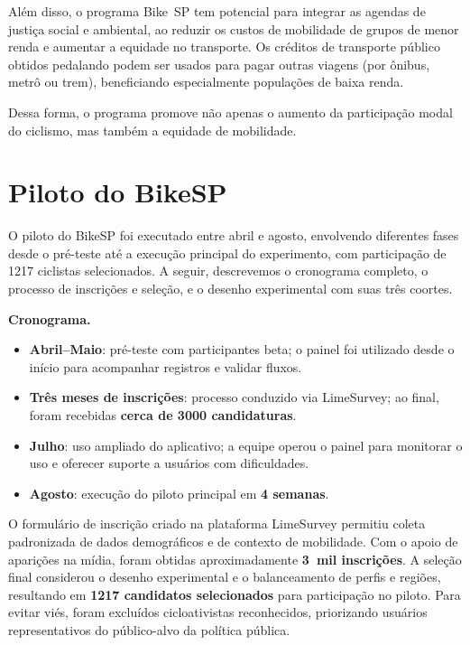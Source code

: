 Além disso, o programa Bike~SP tem potencial para integrar as agendas de justiça
social e ambiental, ao reduzir os custos de mobilidade de grupos de menor renda
e aumentar a equidade no transporte. Os créditos de transporte público obtidos
pedalando podem ser usados para pagar outras viagens (por ônibus, metrô ou trem),
beneficiando especialmente populações de baixa renda.

Dessa forma, o programa promove não apenas o aumento da participação modal do
ciclismo, mas também a equidade de mobilidade\citep{vanoutrive2020, jeekel2017}.

\section{Piloto do BikeSP}
\label{sec:piloto-bikesp}
O piloto do BikeSP foi executado entre abril e agosto, envolvendo diferentes fases desde o pré-teste até a execução principal do experimento, com participação de 1217 ciclistas selecionados. A seguir, descrevemos o cronograma completo, o processo de inscrições e seleção, e o desenho experimental com suas três coortes.

\textbf{Cronograma.} \begin{itemize}
      \item \textbf{Abril--Maio}: pré-teste com participantes beta; o 
      painel foi
            utilizado desde o início para acompanhar registros e validar 
            fluxos.
      \item \textbf{Três meses de inscrições}: processo conduzido via 
      LimeSurvey;
            ao final, foram recebidas \textbf{cerca de 3000 candidaturas}.
      \item \textbf{Julho}: uso ampliado do aplicativo; a equipe operou o 
      painel
            para monitorar o uso e oferecer suporte a usuários
            com dificuldades.
      \item \textbf{Agosto}: execução do piloto principal em \textbf{4 
      semanas}.
    \end{itemize}

O formulário de inscrição criado na plataforma LimeSurvey permitiu
coleta padronizada de dados demográficos e de contexto de mobilidade. Com o
apoio de aparições na mídia, foram obtidas aproximadamente \textbf{3~mil
inscrições}. A seleção final considerou o desenho experimental e o balanceamento
de perfis e regiões, resultando em \textbf{1217 candidatos selecionados} para
participação no piloto. Para evitar viés, foram excluídos cicloativistas
reconhecidos, priorizando usuários representativos do público-alvo da política
pública.

